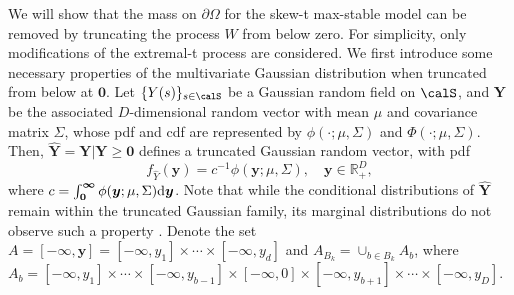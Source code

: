 \documentclass[12pt]{article}
\begin{document}
We will show that the mass on $\partial\Omega$ for the skew-t max-stable model can be removed by truncating the process $W$ from below zero.
For simplicity, only modifications of the extremal-t process are considered. We first introduce some necessary properties of the multivariate Gaussian distribution when truncated from below at $\bm 0$. Let $\{Y(s)\}_{s\in\calS}$ be a Gaussian random field on $\calS$, and $\bm Y$ be the associated $D$-dimensional random vector with mean $\mu$ and covariance matrix $\Sigma$, whose pdf and cdf are represented by $\phi(\cdot;\mu,\Sigma)$ and $\Phi(\cdot;\mu,\Sigma)$. Then, $\hat{\bm Y} = \bm Y| \bm Y\geq \bm 0$ defines a truncated Gaussian random vector, with pdf 
 $$f_{\hat Y}(\bm y) = c^{-1} \phi(\bm y;\mu,\Sigma), \quad \bm y \in \mathbb{R}^D_+,$$
 where $c=\int_{\bm 0}^{\bm \infty} \phi(\bm y;\mu,\Sigma)\text d \bm y$. 
Note that while the conditional distributions of $\hat{\bm Y}$ remain within the truncated Gaussian family, its marginal distributions do not observe such a property \citep{Horrace:2005}.
%
Denote the set $A = [-\bm \infty, \bm y] = [-\infty,y_1]\times\cdots\times[-\infty,y_d] $ and 
$A_{B_k} = \cup_{b\in B_k} A_b$, where $A_b = [-\infty,y_1]\times\cdots\times[-\infty,y_{b-1}]\times[-\infty,0]\times[-\infty,y_{b+1}]\times\cdots\times[-\infty,y_D]$.
\end{document}
